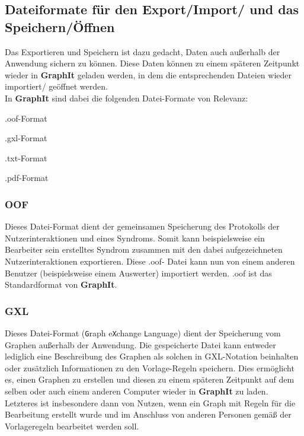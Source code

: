 \documentclass[enabledeprecatedfontcommands,fontsize=11pt,paper=a4,twoside]{scrartcl}
\newcounter{one}
\newcounter{two}[one]
\let\tempone\itemize
\let\temptwo\enditemize
\renewenvironment{itemize}{\tempone\addtolength{\itemsep}{-10.0pt}}{\temptwo}
\begin{document}
\subsection{Dateiformate für den Export/Import/ und das Speichern/Öffnen} \label{format} 
Das Exportieren und Speichern ist dazu gedacht, Daten auch außerhalb der Anwendung sichern zu können. Diese Daten können zu einem späteren Zeitpunkt wieder in \textbf{GraphIt} geladen werden, in dem die entsprechenden Dateien wieder importiert/ geöffnet werden.\\
In \textbf{GraphIt} sind dabei die folgenden Datei-Formate von Relevanz: 
\begin{itemize}
\item .oof-Format
\item .gxl-Format
\item .txt-Format
\item .pdf-Format
\end{itemize}

	\subsubsection{OOF}
	Dieses Datei-Format dient der gemeinsamen Speicherung des Protokolls der Nutzerinteraktionen und eines Syndroms. Somit kann beispielsweise ein Bearbeiter sein erstelltes Syndrom zusammen mit den dabei aufgezeichneten Nutzerinteraktionen exportieren. Diese .oof- Datei kann nun von einem anderen Benutzer (beispielsweise einem Auswerter) importiert werden. .oof ist das Standardformat von \textbf{GraphIt}.
	
	\subsubsection{GXL}
	Dieses Datei-Format (\texttt{G}raph e\texttt{X}change \texttt{L}anguage) dient der Speicherung vom Graphen außerhalb der Anwendung. Die gespeicherte Datei kann entweder lediglich eine Beschreibung des Graphen als solchen in GXL-Notation beinhalten oder zusätzlich Informationen zu den Vorlage-Regeln speichern. Dies ermöglicht es, einen Graphen zu erstellen und diesen zu einem späteren Zeitpunkt auf dem selben oder auch einem anderen Computer wieder in \textbf{GraphIt} zu laden. Letzteres ist insbesondere dann von Nutzen, wenn ein Graph mit Regeln für die Bearbeitung erstellt wurde und im Anschluss von anderen Personen gemäß der Vorlageregeln bearbeitet werden soll.
	
\end{document}

